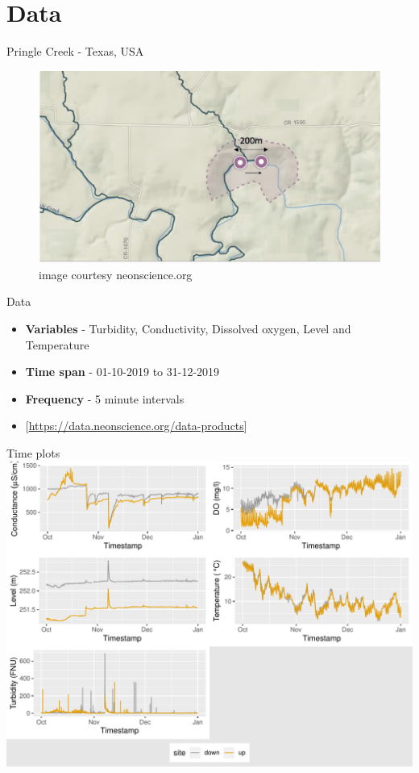 \documentclass[14pt,ignorenonframetext,compress]{beamer}
\begin{document}
\hypertarget{data}{%
\section{Data}\label{data}}

\begin{frame}{Pringle Creek - Texas, USA}
\protect\hypertarget{pringle-creek---texas-usa}{}
\begin{figure}
\includegraphics[width=1\linewidth]{plots/Pringle-creek-map} \caption{image courtesy neonscience.org}\label{fig:pringle-creek-map}
\end{figure}
\end{frame}

\begin{frame}{Data}
\protect\hypertarget{data-1}{}
\begin{itemize}
\item
  \textbf{Variables} - Turbidity, Conductivity, Dissolved oxygen, Level
  and Temperature
\item
  \textbf{Time span} - 01-10-2019 to 31-12-2019
\item
  \textbf{Frequency} - 5 minute intervals
\item
  {[}\url{https://data.neonscience.org/data-products}{]}
\end{itemize}
\end{frame}

\begin{frame}{Time plots}
\protect\hypertarget{time-plots}{}
\includegraphics[width=1\linewidth]{slides_files/figure-beamer/tsplots-1}
\end{frame}
\end{document}
